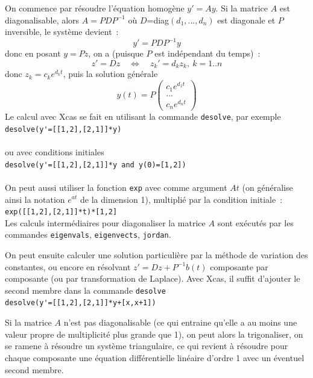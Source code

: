 \documentclass[a4paper,11pt]{article}
\begin{document}
\begin{giacjshere}
On commence par r\'esoudre l'\'equation homog\`ene $y'=Ay$.
Si la matrice $A$ est diagonalisable, alors $A=PDP^{-1}$ o\`u
$D$=diag$(d_1,...,d_n)$ est diagonale et $P$ inversible, le syst\`eme devient~:
$$ y'=PDP^{-1} y$$
donc en posant $y=Pz$, on a (puisque $P$ est ind\'ependant du temps)~:
$$ z'=Dz \quad \Leftrightarrow \quad z_k'=d_kz_k, \ k=1..n$$
donc $z_k=c_k e^{d_kt}$, puis la solution g\'en\'erale
$$y(t)=P\left( \begin{array}{c} c_1 e^{d_1t} \\ ... \\c_n e^{d_nt}
\end{array} \right)$$
Le calcul avec Xcas se fait en utilisant la commande \verb|desolve|,
par exemple\\
\verb|desolve(y'=[[1,2],[2,1]]*y)|\\
\\
ou avec conditions initiales\\
\verb|desolve(y'=[[1,2],[2,1]]*y and y(0)=[1,2])|\\
\\
On peut aussi utiliser la fonction \verb|exp|
avec comme argument $At$ (on g\'en\'eralise ainsi 
la notation $e^{at}$ 
de la dimension 1), multipli\'e par la condition initiale~:\\
\verb|exp([[1,2],[2,1]]*t)*[1,2]|\\
Les calculs interm\'ediaires pour diagonaliser la matrice $A$ sont
ex\'ecut\'es par les commandes \verb|eigenvals|, \verb|eigenvects|,
\verb|jordan|.

On peut ensuite calculer une solution particuli\`ere par la m\'ethode
de variation des constantes, ou encore en r\'esolvant 
$z'=Dz+P^{-1}b(t)$ composante par composante (ou par transformation
de Laplace). Avec Xcas,
il suffit d'ajouter le second membre dans la commande \verb|desolve|\\
\verb|desolve(y'=[[1,2],[2,1]]*y+[x,x+1])|

Si la matrice $A$ n'est pas diagonalisable (ce qui entraine
qu'elle a au moins une valeur propre de
multiplicit\'e plus grande que 1), on peut alors
la trigonaliser, on se ramene \`a r\'esoudre un syst\`eme
triangulaire, ce qui revient \`a r\'esoudre pour chaque
composante une \'equation
diff\'erentielle lin\'eaire d'ordre 1 avec un \'eventuel 
second membre. 


\end{giacjshere}
\end{document}
